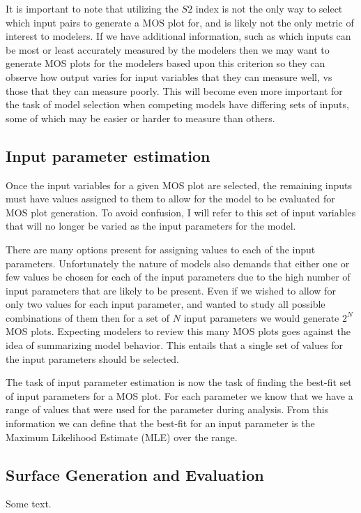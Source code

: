 It is important to note that utilizing the $S2$ index is not the only way to select which input pairs to generate a MOS plot for, and is likely not the only metric of interest to modelers. If we have additional information, such as which inputs can be most or least accurately measured by the modelers then we may want to generate MOS plots for the modelers based upon this criterion so they can observe how output varies for input variables that they can measure well, vs those that they can measure poorly. This will become even more important for the task of model selection when competing models have differing sets of inputs, some of which may be easier or harder to measure than others.

\subsection{Input parameter estimation\label{sec:inp_param_est}}
Once the input variables for a given MOS plot are selected, the remaining inputs must have values assigned to them to allow for the model to be evaluated for MOS plot generation. To avoid confusion, I will refer to this set of input variables that will no longer be varied as the input parameters for the model.

There are many options present for assigning values to each of the input parameters. Unfortunately the nature of models also demands that either one or few values be chosen for each of the input parameters due to the high number of input parameters that are likely to be present. Even if we wished to allow for only two values for each input parameter, and wanted to study all possible combinations of them then for a set of $N$ input parameters we would generate $2^N$ MOS plots. Expecting modelers to review this many MOS plots goes against the idea of summarizing model behavior. This entails that a single set of values for the input parameters should be selected.

The task of input parameter estimation is now the task of finding the best-fit set of input parameters for a MOS plot. For each parameter we know that we have a range of values that were used for the parameter during analysis. From this information we can define that the best-fit for an input parameter is the Maximum Likelihood Estimate (MLE) over the range.

\subsection{Surface Generation and Evaluation\label{sec:surf_usage}}
Some text.
